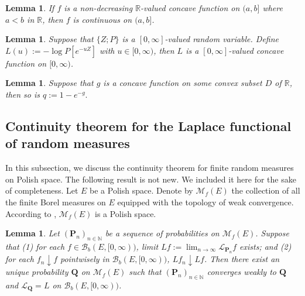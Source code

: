 \documentclass[12pt,a4paper]{amsart}
\numberwithin{equation}{section}
\theoremstyle{plain}
\newtheorem{lem}[thm]{Lemma}
\theoremstyle{definition}
\theoremstyle{remark}
\begin{document}
\begin{lem} \label{Fact:CR!}
	If $f$ is a non-decreasing $\mathbb R$-valued concave function on $(a,b]$ where $a<b$ in $\mathbb R$, then $f$ is continuous on $(a,b]$.
\end{lem}

\begin{lem} \label{Fact:CP!}
	Suppose that $\{Z; P\}$ is a $[0,\infty]$-valued random variable.
	Define $L(u):= - \log P[e^{- u Z}]$ with $u \in [0,\infty)$, then $L$ is a $[0,\infty]$-valued concave function on $[0,\infty)$.
\end{lem}

\begin{lem} \label{lem:CE}
	Suppose that $g$ is a concave function on some convex subset $D$ of $\mathbb R$, then so is $q:= 1- e^{-g}.$
\end{lem}

\subsection{Continuity theorem for the Laplace functional of random measures}
	In this subsection, we discuss the continuity theorem for finite random measures on Polish space.	
	The following result is not new.
	We included it here for the sake of completeness.
	Let $E$ be a Polish space.
	Denote by $\mathcal M_f(E)$ the collection of all the finite Borel measures on $E$ equipped with the topology of weak convergence.
	According to \cite[Lemma 4.5]{Kallenberg2017Random}, $\mathcal M_f(E)$ is a Polish space.
\begin{lem} \label{fact:WC}
	Let $(\mathbf P_n)_{n\in \mathbb N}$ be a sequence of probabilities on $\mathcal M_f(E)$.
	Suppose that
	(1) for each $f \in \mathcal B_b(E,[0,\infty))$, limit $Lf := \lim_{n\to \infty}\mathscr L_{\mathbf P_n}f$ exists; and
	(2) for each $f_n \downarrow f$ pointwisely in $\mathcal B_b(E,[0,\infty))$, $Lf_n \downarrow Lf$.
	Then there exist an unique probability $\mathbf Q$ on $\mathcal M_f(E)$
	such that $(\mathbf P_n)_{n \in \mathbb N}$ converges weakly
to $\mathbf Q$ and  $\mathscr L_\mathbf Q = L$ on $\mathcal B_b(E, [0,\infty))$.
\end{lem}
\end{document}
